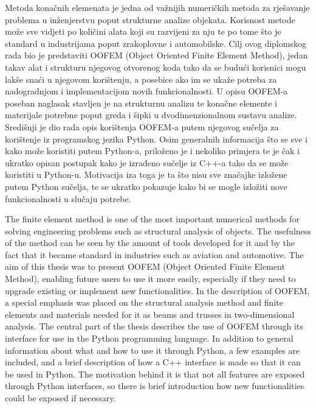 \documentclass[a4paper,twoside,12pt]{memoir} %
\begin{document}
\begin{sazetak}
Metoda konačnih elemenata je jedna od važnijih numeričkih metoda za rješavanje problema u inženjerstvu poput strukturne analize objekata. Korisnost metode može sve vidjeti po količini alata koji su razvijeni za nju te po tome što je standard u industrijama poput zrakoplovne i automobilske. Cilj ovog diplomskog rada bio je predstaviti OOFEM (Object Oriented Finite Element Method), jedan takav alat i strukturu njegovog otvorenog koda tako da se budući korisnici mogu lakše snaći u njegovom korištenju, a posebice ako im se ukaže potreba za nadogradnjom i implementacijom novih funkcionalnosti. U opisu OOFEM-a poseban naglasak stavljen je na strukturnu analizu te konačne elemente i materijale potrebne poput greda i šipki u dvodimenzionalnom sustavu analize. Središnji je dio rada opis korištenja OOFEM-a putem njegovog sučelja za korištenje iz programskog jezika Python.
Osim generalnih informacija što se sve i kako može koristiti putem Python-a, priloženo je i nekoliko primjera te je čak i ukratko opisan postupak kako je izrađeno sučelje iz C++-a tako da se može koristiti u Python-u. Motivacija iza toga je ta što nisu sve značajke izložene putem Python sučelja, te se ukratko pokazuje kako bi se mogle izložiti nove funkcionalnosti u slučaju potrebe.
\end{sazetak}

\begin{summary}
The finite element method is one of the most important numerical methods for solving engineering problems such as structural analysis of objects. The usefulness of the method can be seen by the amount of tools developed for it and by the fact that it became standard in industries such as aviation and automotive. The aim of this thesis was to present OOFEM (Object Oriented Finite Element Method), enabling future users to use it more easily, especially if they need to upgrade existing or implement new functionalities. In the description of OOFEM, a special emphasis was placed on the structural analysis method and finite elements and materials needed for it as beams and trusses in two-dimensional analysis. The central part of the thesis describes the use of OOFEM through its interface for use in the Python programming language. In addition to general information about what and how to use it through Python, a few examples are included, and a brief description of how a C++ interface is made so that it can be used in Python. The motivation behind it is that not all features are exposed through Python interfaces, so there is brief introduction how new functionalities could be exposed if necessary.
\end{summary}
\end{document}
